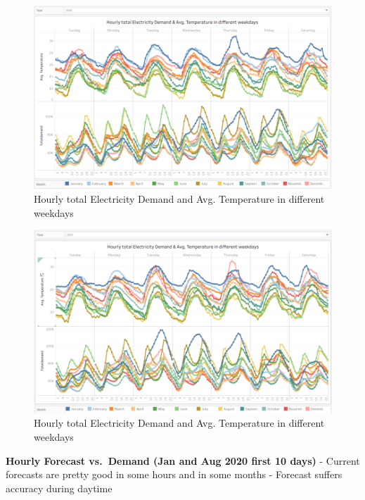 \documentclass[mstat,12pt]{unswthesis}
\begin{document}
\begin{figure}[H]
\includegraphics{snapshots/Hourly Trend 1.png}
\caption{Hourly total Electricity Demand and Avg. Temperature in different weekdays}\label{4.4}
\end{figure}

\begin{figure}[H]
\includegraphics{snapshots/Hourly Trend 2.png}
\caption{Hourly total Electricity Demand and Avg. Temperature in different weekdays}\label{4.5}
\end{figure}

\textbf{Hourly Forecast vs.~Demand (Jan and Aug 2020 first 10 days)}
\newline \newline - Current forecasts are pretty good in some hours and
in some months \newline - Forecast suffers accuracy during daytime
\newline
\end{document}
